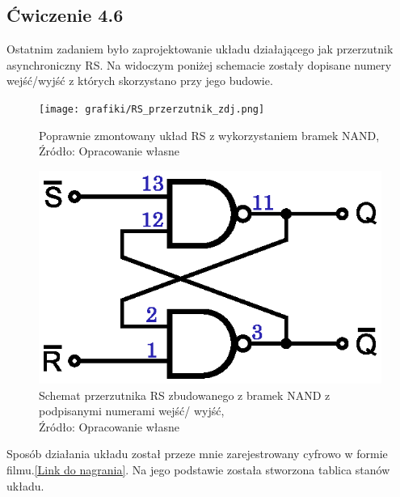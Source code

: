 \documentclass{article}
\begin{document}
    \subsection{Ćwiczenie 4.6}
      Ostatnim zadaniem było zaprojektowanie układu działającego jak przerzutnik asynchroniczny RS. Na widoczym poniżej schemacie zostały dopisane numery wejść/wyjść z których skorzystano przy jego budowie.
      
      \begin{figure}[!ht]
        \begin{minipage}{.5\textwidth}
          \centering
          \texttt{[image: grafiki/RS\_przerzutnik\_zdj.png]}
          \caption{Poprawnie zmontowany układ RS z wykorzystaniem bramek NAND,
          \\Źródło: Opracowanie własne}
            \end{minipage}
          \begin{minipage}{.5\textwidth}
        \centering
        \includegraphics[scale=0.65]{grafiki/SR_NAND_schemat_wej_wyj.eps}
        \caption{Schemat przerzutnika RS zbudowanego z bramek NAND z podpisanymi numerami wejść/ wyjść,
        \\Źródło: Opracowanie własne}
          \end{minipage}
      \end{figure}

      Sposób działania układu został przeze mnie zarejestrowany cyfrowo w formie filmu.\href{https://youtu.be/9eNzdQyRCHI}{[Link do nagrania]}. Na jego podstawie została stworzona tablica stanów układu.
\end{document}

